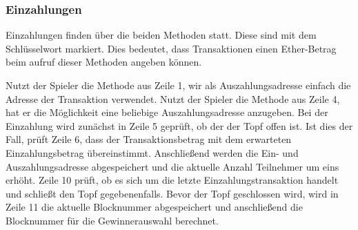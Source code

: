 \subsubsection{Einzahlungen}
Einzahlungen finden über die beiden  Methoden statt. Diese sind mit dem Schlüsselwort  markiert. Dies bedeutet, dass Transaktionen einen Ether-Betrag beim aufruf dieser Methoden angeben können.

Nutzt der Spieler die Methode aus Zeile 1, wir als Auszahlungsadresse einfach die Adresse der Transaktion verwendet. Nutzt der Spieler die Methode aus Zeile 4, hat er die Möglichkeit eine beliebige Auszahlungsadresse anzugeben. Bei der Einzahlung wird zunächst in Zeile 5 geprüft, ob der der Topf offen ist. Ist dies der Fall, prüft Zeile 6, dass der Transaktionsbetrag mit dem erwarteten Einzahlungsbetrag übereinstimmt. Anschließend werden die Ein- und Auszahlungsadresse abgespeichert und die aktuelle Anzahl Teilnehmer um eins erhöht. Zeile 10 prüft, ob es sich um die letzte Einzahlungstransaktion handelt und schließt den Topf gegebenenfalls. Bevor der Topf geschlossen wird, wird in Zeile 11 die aktuelle Blocknummer abgespeichert und anschließend die Blocknummer für die Gewinnerauswahl berechnet.

